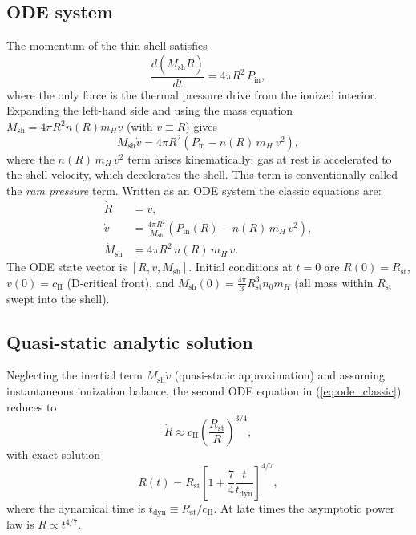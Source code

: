 \documentclass[12pt]{article}
\begin{document}
\subsection{ODE system}

The momentum of the thin shell satisfies
\begin{equation}
  \label{eq:momentum}
  \frac{d(M_\mathrm{sh}\dot{R})}{dt} = 4\pi R^2\,P_\mathrm{in},
\end{equation}
where the only force is the thermal pressure drive from the ionized
interior.  Expanding the left-hand side and using the mass equation
$\dot{M}_\mathrm{sh} = 4\pi R^2 n(R) m_H v$ (with $v\equiv\dot{R}$) gives
\begin{equation}
  M_\mathrm{sh}\dot{v} = 4\pi R^2\!\left(P_\mathrm{in} - n(R)\,m_H\,v^2\right),
\end{equation}
where the $n(R)\,m_H\,v^2$ term arises kinematically: gas at rest is
accelerated to the shell velocity, which decelerates the shell.  This term
is conventionally called the \emph{ram pressure} term.  Written as an ODE
system the classic equations are:
\begin{align}
  \label{eq:ode_classic}
  \dot{R} &= v, \\
  \dot{v} &= \frac{4\pi R^2}{M_\mathrm{sh}}\!\left(P_\mathrm{in}(R)
              - n(R)\,m_H\,v^2\right), \\
  \dot{M}_\mathrm{sh} &= 4\pi R^2\,n(R)\,m_H\,v.
\end{align}
The ODE state vector is $[R, v, M_\mathrm{sh}]$.  Initial conditions at
$t=0$ are $R(0)=R_\mathrm{st}$, $v(0)=c_\mathrm{II}$ (D-critical front), and
$M_\mathrm{sh}(0) = \frac{4\pi}{3}R_\mathrm{st}^3 n_0 m_H$ (all mass within
$R_\mathrm{st}$ swept into the shell).

\subsection{Quasi-static analytic solution}

Neglecting the inertial term $M_\mathrm{sh}\dot{v}$ (quasi-static
approximation) and assuming instantaneous ionization balance, the second
ODE equation in (\ref{eq:ode_classic}) reduces to \citep{Spitzer1978}
\begin{equation}
  \dot{R} \approx c_\mathrm{II}\left(\frac{R_\mathrm{st}}{R}\right)^{3/4},
\end{equation}
with exact solution
\begin{equation}
  \label{eq:spitzer}
  R(t) = R_\mathrm{st}\left[1 + \frac{7}{4}\frac{t}{t_\mathrm{dyn}}\right]^{4/7},
\end{equation}
where the dynamical time is $t_\mathrm{dyn} \equiv R_\mathrm{st}/c_\mathrm{II}$.
At late times the asymptotic power law is $R \propto t^{4/7}$.
\end{document}

